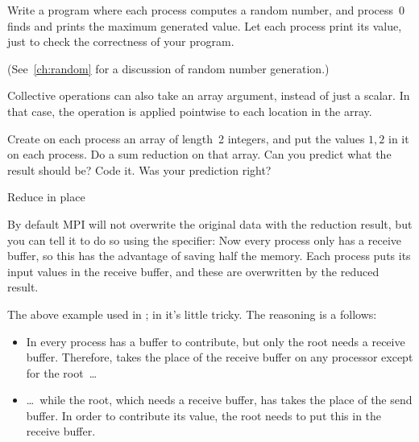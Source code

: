 
\begin{exercise}
  \label{ex:randommax}
  Write a program where each process computes a random number, and process~0
  finds and prints the maximum generated value. Let each process print its value,
  just to check the correctness of your program.
\begin{book}
  (See~\ref{ch:random} for a discussion of random number generation.)
\end{book}
\end{exercise}

Collective operations can also take an array argument, instead of just a scalar.
In that case, the operation is applied pointwise to each location in the array.

\begin{exercise}
  \label{ex:randomcoord}
  Create on each process an array of length~2 integers, and put the
  values $1,2$ in it on each process. Do a sum reduction on that
  array. Can you predict what the result should be?  Code it. Was your
  prediction right?
\end{exercise}

 {Reduce in place}
\label{sec:allreduce-inplace}

By default MPI will not overwrite the original data with the reduction
result, but you can tell it to do so
using the  specifier:
%
%
Now every process only has a receive buffer, so this
has the advantage of saving half the memory.
Each process puts its input values in the receive buffer,
and these are overwritten by the reduced result.

The above example used  in
;
in  it's little  tricky.
The reasoning is a follows:
\begin{itemize}
\item In  every process has a buffer to
  contribute, but only the root needs a receive buffer. Therefore,
   takes the place of the receive buffer
  on any processor except for the root~\ldots
\item \dots~while the root, which needs a receive buffer,
  has  takes the place of the send buffer.
  In order to contribute its value, the root needs to put this in the
  receive buffer.
\end{itemize}

